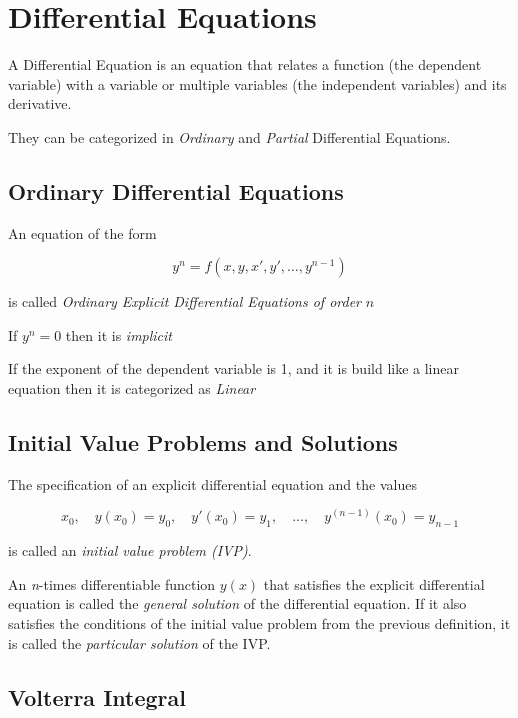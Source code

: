 \newpage
\section{Differential Equations}

A Differential Equation is an equation that relates a function (the dependent variable)
with a variable or multiple variables (the independent variables) and its derivative.
\vspace{\baselineskip}

They can be categorized in \emph{Ordinary} and \emph{Partial} Differential Equations.

\subsection{Ordinary Differential Equations}

An equation of the form 

\[
    y^n = f(x, y, x', y', \dots, y^{n -1})
\]

is called \emph{Ordinary Explicit Differential Equations of order} \(n\)
\vspace{\baselineskip}

If \(y^n = 0\) then it is \emph{implicit}
\vspace{\baselineskip}

If the exponent of the dependent variable is 1, and it
is build like a linear equation then it is categorized as \emph{Linear}

\subsection{Initial Value Problems and Solutions}

The specification of an explicit differential equation and the values

\[
    x_0,\quad y(x_0) = y_0,\quad y'(x_0) = y_1,\quad \dots,\quad y^{(n-1)}(x_0) = y_{n-1}
\]

is called an \emph{initial value problem (IVP)}.

An \emph{n}-times differentiable function \( y(x) \) that satisfies 
the explicit differential equation is called the \emph{general solution} of the 
differential equation. If it also satisfies the conditions of the initial value problem 
from the previous definition, it is called the \emph{particular solution} of the IVP\@.

\subsection{Volterra Integral}

